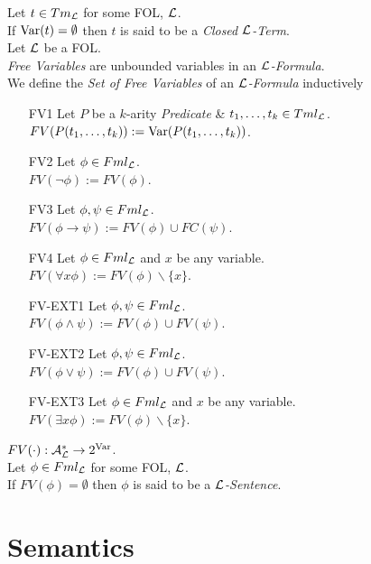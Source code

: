 \documentclass[11pt,a4paper]{article}
\begin{document}
Let $t\in Tm_{\mathcal{L}}$ for some FOL, $\mathcal{L}$.\\
If $\mathrm{Var}(t)=\emptyset$ then $t$ is said to be a \textit{Closed $\mathcal{L}$-Term}.\\

Let $\mathcal{L}$ be a FOL.\\
\textit{Free Variables} are unbounded variables in an \textit{$\mathcal{L}$-Formula}.\\
We define the \textit{Set of Free Variables} of an \textit{$\mathcal{L}$-Formula} inductively
\begin{itemize}
	\item[FV1] Let $P$ be a $k$-arity \textit{Predicate} \& $t_1,\dots,t_k\in Tml_{\mathcal{L}}$.\\
	$FV(P(t_1,\dots,t_k)):=\mathrm{Var}(P(t_1,\dots,t_k))$.
	\item[FV2] Let $\phi\in Fml_{\mathcal{L}}$.\\
	$FV(\neg\phi):=FV(\phi)$.
	\item[FV3] Let $\phi,\psi\in Fml_{\mathcal{L}}$.\\
	$FV(\phi\to\psi):=FV(\phi)\cup FC(\psi)$.
	\item[FV4] Let $\phi\in Fml_{\mathcal{L}}$ and $x$ be any variable.\\
	$FV(\forall x\phi):=FV(\phi)\backslash\{x\}$.
	\item[FV-EXT1]Let $\phi,\psi\in Fml_{\mathcal{L}}$.\\
	$FV(\phi\wedge\psi):=FV(\phi)\cup FV(\psi)$.
	\item[FV-EXT2]Let $\phi,\psi\in Fml_{\mathcal{L}}$.\\
	$FV(\phi\vee\psi):=FV(\phi)\cup FV(\psi)$.
	\item[FV-EXT3]Let $\phi\in Fml_{\mathcal{L}}$ and $x$ be any variable.\\
	$FV(\exists x\phi):=FV(\phi)\backslash\{x\}$.
\end{itemize}
\nb $FV(\cdot):\mathcal{A}^*_{\mathcal{L}}\to2^{\mathrm{Var}}$.\\

Let $\phi\in Fml_{\mathcal{L}}$ for some FOL, $\mathcal{L}$.\\
If $FV(\phi)=\emptyset$ then $\phi$ is said to be a \textit{$\mathcal{L}$-Sentence}.\\


\section{Semantics}
\end{document}
